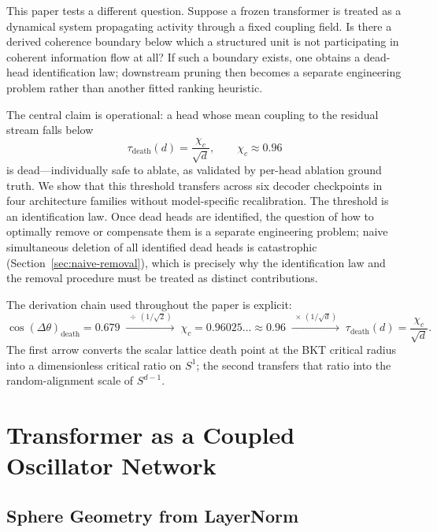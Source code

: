 \documentclass[aps,prd,onecolumn,superscriptaddress,showpacs,12pt]{revtex4-2}
\newcommand{\taudeath}{\tau_{\mathrm{death}}}
\newcommand{\chic}{\chi_c}
\begin{document}
This paper tests a different question. Suppose a frozen transformer is treated as a
dynamical system propagating activity through a fixed coupling field. Is there a
derived coherence boundary below which a structured unit is not participating in
coherent information flow at all? If such a boundary exists, one obtains a
dead-head identification law; downstream pruning then becomes a separate
engineering problem rather than another fitted ranking heuristic.

The central claim is operational: a head whose mean coupling to the residual stream
falls below
\begin{equation}
\taudeath(d)=\frac{\chic}{\sqrt{d}}, \qquad \chic \approx 0.96
\end{equation}
is dead---individually safe to ablate, as validated by per-head ablation ground
truth. We show that this threshold transfers across six decoder checkpoints in
four architecture families without model-specific recalibration. The threshold is
an identification law. Once dead heads are identified, the question of how to
optimally remove or compensate them is a separate engineering problem; naive
simultaneous deletion of all identified dead heads is catastrophic (Section~\ref{sec:naive-removal}), which is precisely why the identification law
and the removal procedure must be treated as distinct contributions.

The derivation chain used throughout the paper is explicit:
\begin{equation}
\cos(\Delta \theta)_{\mathrm{death}} = 0.679
\;\xrightarrow{\;\div\, (1/\sqrt{2})\;}\;
\chic = 0.96025\ldots \approx 0.96
\;\xrightarrow{\;\times\, (1/\sqrt{d})\;}\;
\taudeath(d)=\frac{\chic}{\sqrt{d}}.
\end{equation}
The first arrow converts the scalar lattice death point at the BKT critical radius
into a dimensionless critical ratio on $S^1$; the second transfers that ratio into
the random-alignment scale of $S^{d-1}$.

\section{Transformer as a Coupled Oscillator Network}

\subsection{Sphere Geometry from LayerNorm}
\end{document}
